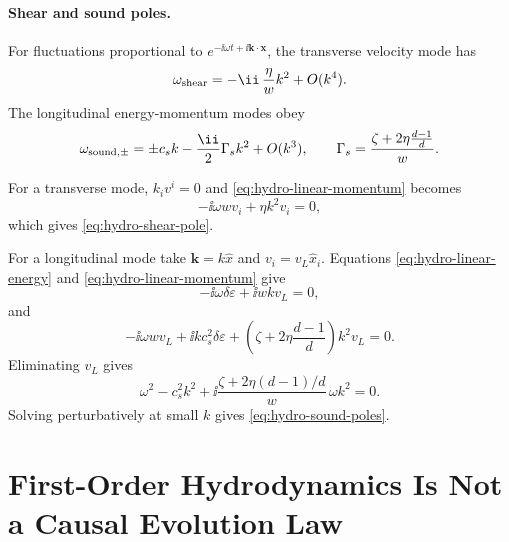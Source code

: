 \paragraph{Shear and sound poles.}
For fluctuations proportional to
\(e^{-\ii\omega t+\ii\mathbf k\cdot\mathbf x}\), the transverse velocity
mode has
\begin{equation}
  \omega_{\rm shear}
  =
  -\ii\,\frac{\eta}{w}k^2+O(k^4).
  \label{eq:hydro-shear-pole}
\end{equation}
The longitudinal energy-momentum modes obey
\begin{equation}
  \omega_{\rm sound,\pm}
  =
  \pm c_s k
  -\frac{\ii}{2}\Gamma_s k^2
  +O(k^3),
  \qquad
  \Gamma_s
  =
  \frac{\zeta+2\eta\frac{d-1}{d}}{w}.
  \label{eq:hydro-sound-poles}
\end{equation}

For a transverse mode, \(k_i v^i=0\) and
\eqref{eq:hydro-linear-momentum} becomes
\[
  -\ii\omega w v_i+\eta k^2v_i=0,
\]
which gives \eqref{eq:hydro-shear-pole}.

For a longitudinal mode take \(\mathbf k=k\hat x\) and \(v_i=v_L\hat x_i\).
Equations \eqref{eq:hydro-linear-energy} and
\eqref{eq:hydro-linear-momentum} give
\[
  -\ii\omega\delta\varepsilon+\ii wk v_L=0,
\]
and
\[
  -\ii\omega wv_L+\ii k c_s^2\delta\varepsilon
  +\left(\zeta+2\eta\frac{d-1}{d}\right)k^2v_L=0 .
\]
Eliminating \(v_L\) gives
\[
  \omega^2-c_s^2k^2
  +\ii\frac{\zeta+2\eta(d-1)/d}{w}\,\omega k^2=0.
\]
Solving perturbatively at small \(k\) gives
\eqref{eq:hydro-sound-poles}.

\section{First-Order Hydrodynamics Is Not a Causal Evolution Law}
\label{sec:hydro-first-order-acausality}

